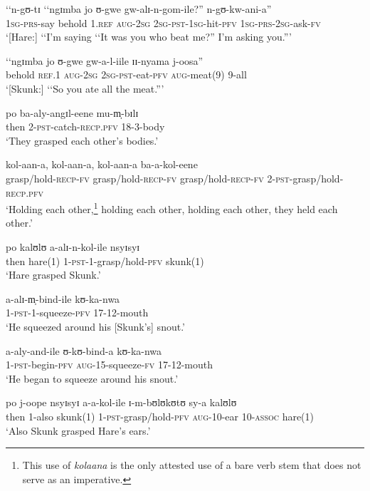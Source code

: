 \begin{exe}
\ex \gll \lq\lq n-gʊ-tɪ \lq\lq ngɪmba jo ʊ-gwe gw-alɪ-n-gom-ile?'' n-gʊ-kw-ani-a''\\
\phantom{\lq\lq}\textsc{1sg}-\textsc{prs}-say \phantom{\lq\lq}behold \textsc{1.ref} \textsc{aug}-\textsc{2sg} \textsc{2sg}-\textsc{pst}-\textsc{1sg}-hit-\textsc{pfv} \textsc{1sg}-\textsc{prs}-\textsc{2sg}-ask-\textsc{fv}\\
\glt \lq [Hare:] \lq\lq I'm saying \lq\lq It was you who beat me?'' I'm asking you.''{}'

\ex \gll \lq\lq ngɪmba jo ʊ-gwe gw-a-l-iile ɪɪ-nyama j-oosa''\\
\phantom{\lq\lq}behold \textsc{ref.1} \textsc{aug}-\textsc{2sg} \textsc{2sg}-\textsc{pst}-eat-\textsc{pfv} \textsc{aug}-meat(9) 9-all\\
\glt \lq [Skunk:] \lq\lq So you ate all the meat.''{}'

\ex \gll po ba-aly-angɪl-eene mu-m̩-bɪlɪ\\
then 2-\textsc{pst}-catch-\textsc{recp.pfv} 18-3-body\\
\glt \lq They grasped each other's bodies.'

\ex \gll kol-aan-a, kol-aan-a, kol-aan-a ba-a-kol-eene\\
grasp/hold-\textsc{recp}-\textsc{fv} grasp/hold-\textsc{recp}-\textsc{fv} grasp/hold-\textsc{recp}-\textsc{fv} 2-\textsc{pst}-grasp/hold-\textsc{recp.pfv}\\
\glt \lq Holding each other,\footnote{This use of \textit{kolaana} is the only attested use of a bare verb stem that does not serve as an imperative.} holding each other, holding each other, they held each other.'

\ex \gll po kalʊlʊ a-alɪ-n-kol-ile nsyɪsyɪ\\
then hare(1) 1-\textsc{pst}-1-grasp/hold-\textsc{pfv} skunk(1)\\
\glt \lq Hare grasped Skunk.'

\ex \gll a-alɪ-m̩-bind-ile kʊ-ka-nwa\\
1-\textsc{pst}-1-squeeze-\textsc{pfv} 17-12-mouth\\
\glt \lq He squeezed around his [Skunk's] snout.'

\ex \gll a-aly-and-ile ʊ-kʊ-bind-a kʊ-ka-nwa\\
1-\textsc{pst}-begin-\textsc{pfv} \textsc{aug}-15-squeeze-\textsc{fv} 17-12-mouth\\
\glt \lq He began to squeeze around his snout.'

\ex \gll po j-oope nsyɪsyɪ a-a-kol-ile ɪ-m-bʊlʊkʊtʊ sy-a kalʊlʊ\\
then 1-also skunk(1) 1-\textsc{pst}-grasp/hold-\textsc{pfv} \textsc{aug}-10-ear 10-\textsc{assoc} hare(1)\\
\glt \lq Also Skunk grasped Hare's ears.'


\end{exe}
